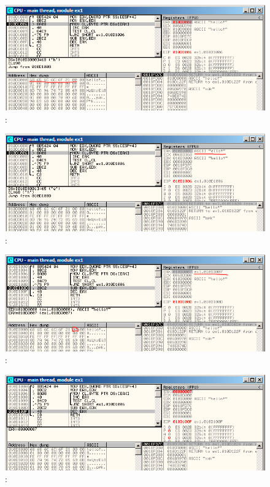 \begin{figure}[H]
\centering
\includegraphics[scale=0.66]{patterns/10_strlen/olly1.png}
\caption{\olly: }
\label{fig:strlen_olly_1}
\end{figure}

\begin{figure}[H]
\centering
\includegraphics[scale=0.66]{patterns/10_strlen/olly2.png}
\caption{\olly: }
\label{fig:strlen_olly_2}
\end{figure}

\begin{figure}[H]
\centering
\includegraphics[scale=0.66]{patterns/10_strlen/olly3.png}
\caption{\olly: }
\label{fig:strlen_olly_3}
\end{figure}

\begin{figure}[H]
\centering
\includegraphics[scale=0.66]{patterns/10_strlen/olly4.png}
\caption{\olly: }
\label{fig:strlen_olly_4}
\end{figure}


